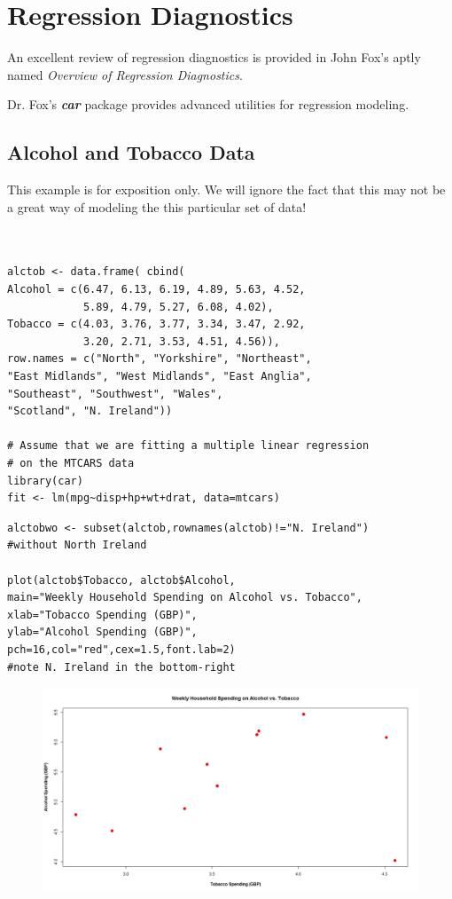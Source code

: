 \documentclass[residuals.tex]{subfiles}
\begin{document}
\section*{Regression Diagnostics}

An excellent review of regression diagnostics is provided in John Fox's aptly named \textit{Overview of Regression Diagnostics}. 

Dr. Fox's \textbf{\textit{car}} package provides advanced utilities for regression modeling.

\subsection{Alcohol and Tobacco Data}
This example is for exposition only. We will ignore the fact that this may not be a great way of modeling the this particular set of data!


\begin{framed}
\begin{verbatim}


alctob <- data.frame( cbind(
Alcohol = c(6.47, 6.13, 6.19, 4.89, 5.63, 4.52, 
            5.89, 4.79, 5.27, 6.08, 4.02),
Tobacco = c(4.03, 3.76, 3.77, 3.34, 3.47, 2.92, 
            3.20, 2.71, 3.53, 4.51, 4.56)),
row.names = c("North", "Yorkshire", "Northeast", 
"East Midlands", "West Midlands", "East Anglia", 
"Southeast", "Southwest", "Wales", 
"Scotland", "N. Ireland"))

# Assume that we are fitting a multiple linear regression
# on the MTCARS data
library(car)
fit <- lm(mpg~disp+hp+wt+drat, data=mtcars)

\end{verbatim}
\end{framed}


\begin{framed}
\begin{verbatim}
alctobwo <- subset(alctob,rownames(alctob)!="N. Ireland") 
#without North Ireland

plot(alctob$Tobacco, alctob$Alcohol,
main="Weekly Household Spending on Alcohol vs. Tobacco",
xlab="Tobacco Spending (GBP)",
ylab="Alcohol Spending (GBP)",
pch=16,col="red",cex=1.5,font.lab=2) 
#note N. Ireland in the bottom-right

\end{verbatim}	
\end{framed}
\begin{figure}
\centering
\includegraphics[width=1.3\linewidth]{alcotob}
\caption{}
\label{fig:alcotob}
\end{figure}
\end{document}
